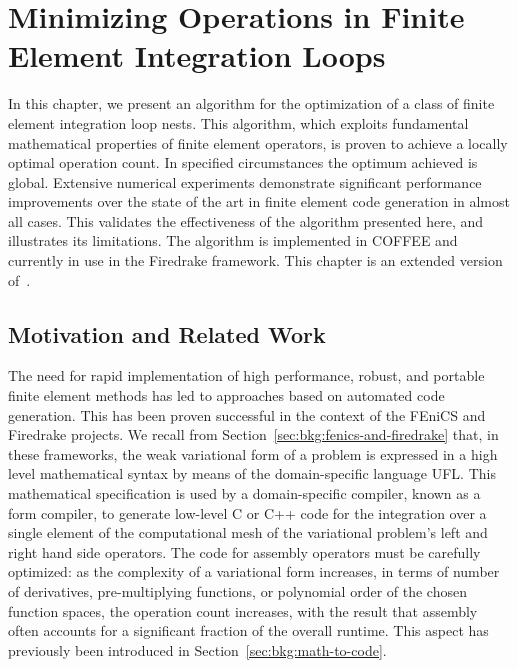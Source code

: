 
\chapter{Minimizing Operations in Finite Element Integration Loops}
\label{ch:optimality}

In this chapter, we present an algorithm for the optimization of a class of finite element integration loop nests. This algorithm, which exploits fundamental mathematical properties of finite element operators, is proven to achieve a locally optimal operation count. In specified circumstances the optimum achieved is global. Extensive numerical experiments demonstrate significant performance improvements over the state of the art in finite element code generation in almost all cases. This validates the effectiveness of the algorithm presented here, and illustrates its limitations. The algorithm is implemented in COFFEE and currently in use in the Firedrake framework. This chapter is an extended version of~\citep{Luporini-minimalflops}.

\section{Motivation and Related Work}

The need for rapid implementation of high performance, robust, and portable finite element methods has led to approaches based on automated code generation. This has been proven successful in the context of the FEniCS  and Firedrake projects. We recall from Section~\ref{sec:bkg:fenics-and-firedrake} that, in these frameworks, the weak variational form of a problem is expressed in a high level mathematical syntax by means of the domain-specific language UFL. This mathematical specification is used by a domain-specific compiler, known as a form compiler, to generate low-level C or C++ code for the integration over a single element of the computational mesh of the variational problem's left and right hand side operators. The code for assembly operators must be carefully optimized: as the complexity of a variational form increases, in terms of number of derivatives, pre-multiplying functions, or polynomial order of the chosen function spaces, the operation count increases, with the result that assembly often accounts for a significant fraction of the overall runtime. This aspect has previously been introduced in Section~\ref{sec:bkg:math-to-code}.

